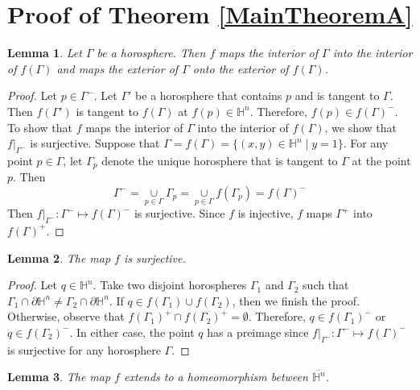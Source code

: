 \documentclass[12pt,reqno,oneside]{amsart}
\theoremstyle{plain}
\newtheorem{Lemma}{Lemma}[section]
\theoremstyle{definition}
\theoremstyle{remark}
\numberwithin{equation}{section}
\renewcommand{\H}{{\mathbb{H}^n}}
\newcommand{\Ga}{{\Gamma}}
\newcommand{\PH}{{\partial \H}}
\newcommand{\OG}{{\Ga^-}}
\newcommand{\below}[2]{{\mathop{#1}\limits_{#2}}}
\begin{document}
\section{Proof of Theorem \eqref{MainTheoremA}}
\begin{Lemma}\label{iioo}
	Let $\Ga$ be a horosphere. Then $f$ maps the interior of $\Ga$ into the
	interior of $f(\Ga)$ and maps the exterior of $\Ga$ onto the exterior of
	$f(\Ga)$.
\end{Lemma}
\begin{proof}
	Let $p \in \OG$.  Let $\Ga'$ be a horosphere that contains $p$ and is
	tangent to $\Ga$.  Then $f(\Ga')$ is tangent to $f(\Ga)$ at $f(p) \in \H$.
	Therefore, $f(p) \in f(\Ga)^-$.  To show that $f$ maps the interior of $\Ga$
	into the interior of $f(\Ga)$, we show that $f|_\OG$ is surjective.  
	Suppose that $\Ga=f(\Ga)=\{(x,y)\in \H \mid y=1\}$.  For any point $p \in
	\Ga$, let $\Ga_p$ denote the unique horosphere that is tangent to $\Ga$
	at the point $p$.
	Then
	\begin{equation}
		\Ga^-=\below{\cup}{p\in \Ga}\Ga_p=\below{\cup}{p\in \Ga}f(\Ga_p)=f(\Ga)^-
	\end{equation}
	Then $f|_{\Ga^-}: \Ga^- \mapsto f(\Ga)^-$ is surjective.  Since $f$ is
	injective, $f$ maps $\Ga^+$ into $f(\Ga)^+$.
\end{proof}
\begin{Lemma}
	The map $f$ is surjective.
\end{Lemma}
\begin{proof}
	Let $q \in \H$.  Take two disjoint horospheres $\Ga_1$ and $\Ga_2$ such that
	$\Ga_1\cap \PH \neq \Ga_2 \cap \PH$.  If $q \in f(\Ga_1) \cup f(\Ga_2)$, then we finish the proof.  Otherwise, observe that $f(\Ga_1)^+ \cap
	f(\Ga_2)^+=\emptyset$.  Therefore, $q \in f(\Ga_1)^-$ or $q\in f(\Ga_2)^-$.
	In either case, the point $q$ has a preimage since $f|_{\Ga^-} : \Ga^-
	\mapsto f(\Ga)^-$ is surjective for any horosphere $\Ga$.
\end{proof}
\begin{Lemma}
	The map $f$ extends to a homeomorphism between $\overline{\H}$.
\end{Lemma}
\end{document}
